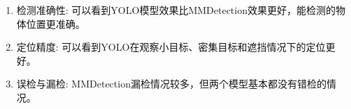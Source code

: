 \begin{enumerate}
    \item 检测准确性: 可以看到YOLO模型效果比MMDetection效果更好，能检测的物体位置更准确。
    \item 定位精度: 可以看到YOLO在观察小目标、密集目标和遮挡情况下的定位更好。
    \item 误检与漏检: MMDetection漏检情况较多，但两个模型基本都没有错检的情况。
\end{enumerate}
